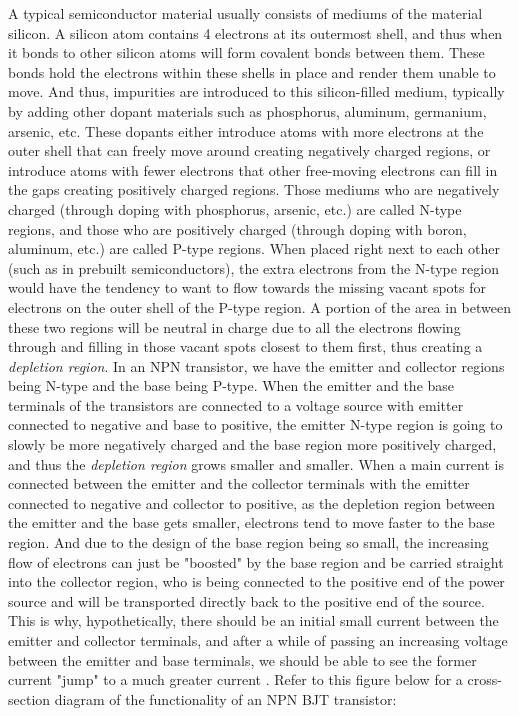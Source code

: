 \documentclass[10pt,letterpaper,onecolumn]{article}
\begin{document}
A typical semiconductor material usually consists of mediums of the material silicon. A silicon atom contains 4 electrons at its outermost shell, and thus when it bonds to other silicon atoms will form covalent bonds between them. These bonds hold the electrons within these shells in place and render them unable to move. And thus, impurities are introduced to this silicon-filled medium, typically by adding other dopant materials such as phosphorus, aluminum, germanium, arsenic, etc. These dopants either introduce atoms with more electrons at the outer shell that can freely move around creating negatively charged regions, or introduce atoms with fewer electrons that other free-moving electrons can fill in the gaps creating positively charged regions. Those mediums who are negatively charged (through doping with phosphorus, arsenic, etc.) are called N-type regions, and those who are positively charged (through doping with boron, aluminum, etc.) are called P-type regions. When placed right next to each other (such as in prebuilt semiconductors), the extra electrons from the N-type region would have the tendency to want to flow towards the missing vacant spots for electrons on the outer shell of the P-type region. A portion of the area in between these two regions will be neutral in charge due to all the electrons flowing through and filling in those vacant spots closest to them first, thus creating a {\it depletion region}. In an NPN transistor, we have the emitter and collector regions being N-type and the base being P-type. When the emitter and the base terminals of the transistors are connected to a voltage source with emitter connected to negative and base to positive, the emitter N-type region is going to slowly be more negatively charged and the base region more positively charged, and thus the {\it depletion region} grows smaller and smaller. When a main current is connected between the emitter and the collector terminals with the emitter connected to negative and collector to positive, as the depletion region between the emitter and the base gets smaller, electrons tend to move faster to the base region. And due to the design of the base region being so small, the increasing flow of electrons can just be "boosted" by the base region and be carried straight into the collector region, who is being connected to the positive end of the power source and will be transported directly back to the positive end of the source. This is why, hypothetically, there should be an initial small current between the emitter and collector terminals, and after a while of passing an increasing voltage between the emitter and base terminals, we should be able to see the former current "jump" to a much greater current \cite{ben}. Refer to this figure below for a cross-section diagram of the functionality of an NPN BJT transistor:
\end{document}
